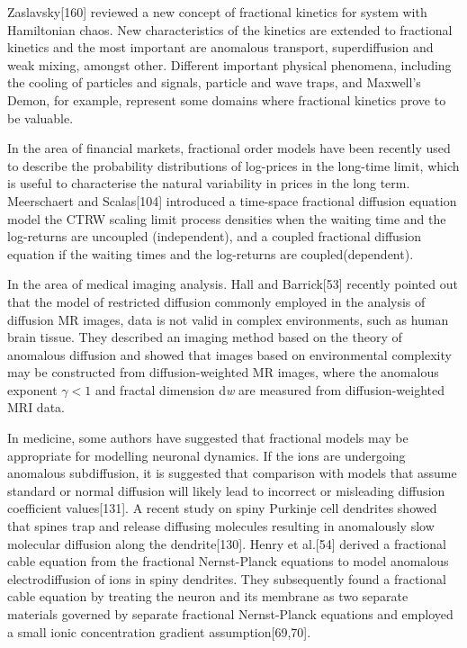{Zaslavsky[160] reviewed a new concept of fractional kinetics for system with Hamiltonian chaos. New characteristics of the kinetics are extended to fractional kinetics and the most important are anomalous transport, superdiffusion and weak mixing, amongst other. Different important physical phenomena, including the cooling of particles and signals, particle and wave traps, and Maxwell's Demon, for example, represent some domains where fractional kinetics prove to be valuable.\

In the area of financial markets, fractional order models have been recently used to describe the probability distributions of log-prices in the long-time limit, which is useful to characterise the natural variability in prices in the long term. Meerschaert and Scalas[104] introduced a time-space fractional diffusion equation model the CTRW scaling limit process densities when the waiting time and the log-returns are uncoupled (independent), and a coupled fractional diffusion equation if the waiting times and the log-returns are coupled(dependent).\

In the area of medical imaging analysis. Hall and Barrick[53] recently pointed out that the model of restricted diffusion commonly employed in the analysis of diffusion MR images, data is not valid in complex environments, such as human brain tissue. They described an imaging method based on the theory of anomalous diffusion and showed that images based on environmental complexity may be constructed from diffusion-weighted MR images, where the anomalous exponent $\gamma <1$ and fractal dimension d\emph{w} are measured from diffusion-weighted MRI data.\

In medicine, some authors have suggested that fractional models may be appropriate for modelling neuronal dynamics. If the ions are undergoing anomalous subdiffusion, it is suggested that comparison with models that assume standard or normal diffusion will likely lead to incorrect or misleading diffusion coefficient values[131]. A recent study on spiny Purkinje cell dendrites showed that spines trap and release diffusing molecules resulting in anomalously slow molecular diffusion along the dendrite[130]. Henry et al.[54] derived a fractional cable equation from the fractional Nernst-Planck equations to model anomalous electrodiffusion of ions in spiny dendrites. They subsequently found a fractional cable equation by treating the neuron and its membrane as two separate materials governed by separate fractional Nernst-Planck equations and employed a small ionic concentration gradient assumption[69,70].\

}
